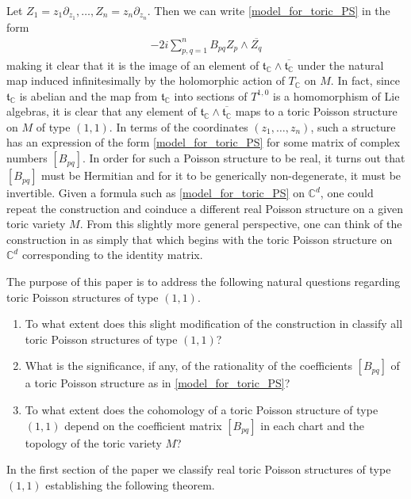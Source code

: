 \documentclass[10pt,a4paper]{amsart}
\numberwithin{equation}{section}
\begin{document}
Let $Z_1=z_1\partial_{z_1},\dots,Z_n=z_n\partial_{z_n}$. Then we can write \eqref{model_for_toric_PS} in the form
\begin{gather*}
-2i\sum_{p,q=1}^n B_{pq} Z_p\wedge\overline{Z_q}
\end{gather*}
making it clear that it is the image of an element of ${\mathfrak t}_{\mathbb C}\wedge \overline{{\mathfrak t}_{\mathbb C}}$ under the natural map induced inf\/initesimally by the holomorphic action of $T_{\mathbb C}$ on $M$. In fact, since ${\mathfrak t}_{\mathbb C}$ is abelian and the map from ${\mathfrak t}_{\mathbb C}$ into sections of $T^{1,0}$ is a homomorphism of Lie algebras, it is clear that any element of ${\mathfrak t}_{\mathbb C}\wedge \overline{{\mathfrak t}_{\mathbb C}}$ maps to a toric Poisson structure on $M$ of type $(1,1)$. In terms of the coordinates $(z_1,\dots,z_n)$, such a structure has an expression of the form \eqref{model_for_toric_PS} for some matrix of complex numbers $[B_{pq}]$. In order for such a Poisson structure to be real, it turns out that $[B_{pq}]$ must be Hermitian and for it to be generically non-degenerate, it must be invertible. Given a formula such as \eqref{model_for_toric_PS} on ${\mathbb C}^d$, one could repeat the construction and coinduce a dif\/ferent real Poisson structure on a given toric variety $M$. From this slightly more general perspective, one can think of the construction in \cite{Caine} as simply that which begins with the toric Poisson structure on ${\mathbb C}^d$ corresponding to the identity matrix.

The purpose of this paper is to address the following natural questions regarding toric Poisson structures of type $(1,1)$.
\begin{enumerate}\itemsep=0pt
\item To what extent does this slight modif\/ication of the construction in \cite{Caine} classify all toric Poisson structures of type $(1,1)$?
\item What is the signif\/icance, if any, of the rationality of the coef\/f\/icients $[B_{pq}]$ of a toric Poisson structure as in \eqref{model_for_toric_PS}?
\item To what extent does the cohomology of a toric Poisson structure of type $(1,1)$ depend on the coef\/f\/icient matrix $[B_{pq}]$ in each chart and the topology of the toric variety $M$?
\end{enumerate}
In the f\/irst section of the paper we classify real toric Poisson structures of type $(1,1)$ establishing the following theorem.
\end{document}
